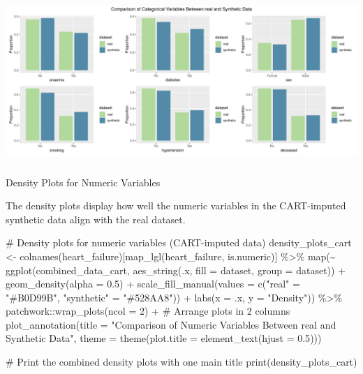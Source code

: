 \documentclass[
  letterpaper,
  DIV=11,
  numbers=noendperiod]{scrartcl}
\makeatletter
\let\oldsubparagraph\subparagraph
\renewcommand{\subparagraph}{
    \@ifstar
      \xxxSubParagraphStar
      \xxxSubParagraphNoStar
  }
\newcommand{\xxxSubParagraphStar}[1]{\oldsubparagraph*{#1}\mbox{}}
\newcommand{\xxxSubParagraphNoStar}[1]{\oldsubparagraph{#1}\mbox{}}
\newenvironment{Shaded}{\begin{snugshade}}{\end{snugshade}}
\newcommand{\AttributeTok}[1]{\textcolor[rgb]{0.40,0.45,0.13}{#1}}
\newcommand{\CommentTok}[1]{\textcolor[rgb]{0.37,0.37,0.37}{#1}}
\newcommand{\DecValTok}[1]{\textcolor[rgb]{0.68,0.00,0.00}{#1}}
\newcommand{\FloatTok}[1]{\textcolor[rgb]{0.68,0.00,0.00}{#1}}
\newcommand{\FunctionTok}[1]{\textcolor[rgb]{0.28,0.35,0.67}{#1}}
\newcommand{\NormalTok}[1]{\textcolor[rgb]{0.00,0.23,0.31}{#1}}
\newcommand{\OtherTok}[1]{\textcolor[rgb]{0.00,0.23,0.31}{#1}}
\newcommand{\SpecialCharTok}[1]{\textcolor[rgb]{0.37,0.37,0.37}{#1}}
\newcommand{\StringTok}[1]{\textcolor[rgb]{0.13,0.47,0.30}{#1}}
\makeatother
\begin{document}
\begin{center}
\includegraphics[width=1\linewidth,height=\textheight,keepaspectratio]{heart_failure_synthetic_data_project_files/figure-pdf/Bar plots for categorical variables (CART-imputed data)-1.pdf}
\end{center}

\subparagraph{Density Plots for Numeric
Variables}\label{density-plots-for-numeric-variables-1}

The density plots display how well the numeric variables in the
CART-imputed synthetic data align with the real dataset.

\begin{Shaded}
\begin{Highlighting}[]
\CommentTok{\# Density plots for numeric variables (CART{-}imputed data)}
\NormalTok{density\_plots\_cart }\OtherTok{\textless{}{-}} \FunctionTok{colnames}\NormalTok{(heart\_failure)[}\FunctionTok{map\_lgl}\NormalTok{(heart\_failure, is.numeric)] }\SpecialCharTok{\%\textgreater{}\%}
  \FunctionTok{map}\NormalTok{(}\SpecialCharTok{\textasciitilde{}} \FunctionTok{ggplot}\NormalTok{(combined\_data\_cart, }\FunctionTok{aes\_string}\NormalTok{(.x, }\AttributeTok{fill =} \StringTok{\textquotesingle{}dataset\textquotesingle{}}\NormalTok{, }\AttributeTok{group =} \StringTok{\textquotesingle{}dataset\textquotesingle{}}\NormalTok{)) }\SpecialCharTok{+}
        \FunctionTok{geom\_density}\NormalTok{(}\AttributeTok{alpha =} \FloatTok{0.5}\NormalTok{) }\SpecialCharTok{+}
        \FunctionTok{scale\_fill\_manual}\NormalTok{(}\AttributeTok{values =} \FunctionTok{c}\NormalTok{(}\StringTok{"real"} \OtherTok{=} \StringTok{"\#B0D99B"}\NormalTok{, }\StringTok{"synthetic"} \OtherTok{=} \StringTok{"\#528AA8"}\NormalTok{)) }\SpecialCharTok{+}
        \FunctionTok{labs}\NormalTok{(}\AttributeTok{x =}\NormalTok{ .x, }\AttributeTok{y =} \StringTok{"Density"}\NormalTok{)) }\SpecialCharTok{\%\textgreater{}\%}
\NormalTok{  patchwork}\SpecialCharTok{::}\FunctionTok{wrap\_plots}\NormalTok{(}\AttributeTok{ncol =} \DecValTok{2}\NormalTok{) }\SpecialCharTok{+}  \CommentTok{\# Arrange plots in 2 columns}
  \FunctionTok{plot\_annotation}\NormalTok{(}\AttributeTok{title =} \StringTok{"Comparison of Numeric Variables Between real and Synthetic Data"}\NormalTok{,}
                  \AttributeTok{theme =} \FunctionTok{theme}\NormalTok{(}\AttributeTok{plot.title =} \FunctionTok{element\_text}\NormalTok{(}\AttributeTok{hjust =} \FloatTok{0.5}\NormalTok{)))}

\CommentTok{\# Print the combined density plots with one main title}
\FunctionTok{print}\NormalTok{(density\_plots\_cart)}
\end{Highlighting}
\end{Shaded}
\end{document}
